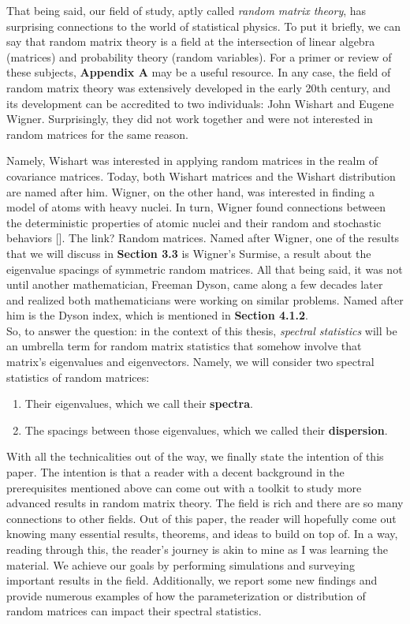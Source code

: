 That being said, our field of study, aptly called \textit{random matrix theory}, has surprising connections to the world of statistical physics.
To put it briefly, we can say that random matrix theory is a field at the intersection of linear algebra (matrices) and probability theory (random variables).
For a primer or review of these subjects, \textbf{Appendix A} may be a useful resource.
In any case, the field of random matrix theory was extensively developed in the early 20th century, and its development can be accredited to two individuals: John Wishart and Eugene Wigner.
Surprisingly, they did not work together and were not interested in random matrices for the same reason.

Namely, Wishart was interested in applying random matrices in the realm of covariance matrices. Today, both Wishart matrices and the Wishart distribution are named after him.
Wigner, on the other hand, was interested in finding a model of atoms with heavy nuclei.
In turn, Wigner found connections between the deterministic properties of atomic nuclei and their random and stochastic behaviors [\cite{wigneratom}].
The link? Random matrices.
Named after Wigner, one of the results that we will discuss in \textbf{Section 3.3} is Wigner's Surmise, a result about the eigenvalue spacings of symmetric random matrices.
All that being said, it was not until another mathematician, Freeman Dyson, came along a few decades later and realized both mathematicians were working on similar problems.
Named after him is the Dyson index, which is mentioned in \textbf{Section 4.1.2}. \\

So, to answer the question: in the context of this thesis, \textit{spectral statistics} will be an umbrella term for random matrix statistics that somehow involve that matrix's eigenvalues and eigenvectors.
Namely, we will consider two spectral statistics of random matrices:
  \begin{enumerate}
    \item Their eigenvalues, which we call their \textbf{spectra}.
    \item The spacings between those eigenvalues, which we called their \textbf{dispersion}.\\
  \end{enumerate}

With all the technicalities out of the way, we finally state the intention of this paper.
The intention is that a reader with a decent background in the prerequisites mentioned above can come out with a toolkit to study more advanced results in random matrix theory.
The field is rich and there are so many connections to other fields.
Out of this paper, the reader will hopefully come out knowing many essential results, theorems, and ideas to build on top of.
In a way, reading through this, the reader's journey is akin to mine as I was learning the material.
We achieve our goals by performing simulations and surveying important results in the field.
Additionally, we report some new findings and provide numerous examples of how the parameterization or distribution of random matrices can impact their spectral statistics.

